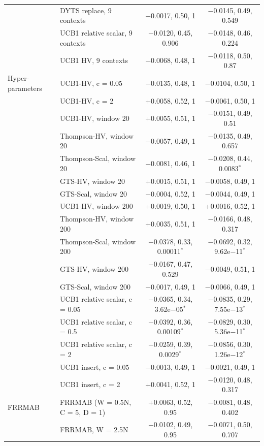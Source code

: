 \documentclass[final,3p,times,11pt,authoryear]{elsarticle}
\begin{document}
\begin{center}
\begin{tabularx}{\linewidth}{lXcc}
 & DYTS replace, 9 contexts & $-$0.0017, 0.50, 1 & $-$0.0145, 0.49, 0.549 \\
 & UCB1 relative scalar, 9 contexts & $-$0.0120, 0.45, 0.906 & $-$0.0148, 0.46, 0.224 \\
 & UCB1 HV, 9 contexts & $-$0.0068, 0.48, 1 & $-$0.0118, 0.50, 0.87 \\
Hyper-parameters & UCB1-HV, c = 0.05 & $-$0.0135, 0.48, 1 & $-$0.0104, 0.50, 1 \\
 & UCB1-HV, c = 2 & +0.0058, 0.52, 1 & $-$0.0061, 0.50, 1 \\
 & UCB1-HV, window 20 & +0.0055, 0.51, 1 & $-$0.0151, 0.49, 0.51 \\
 & Thompson-HV, window 20 & $-$0.0057, 0.49, 1 & $-$0.0135, 0.49, 0.657 \\
 & Thompson-Scal, window 20 & $-$0.0081, 0.46, 1 & $-$0.0208, 0.44, 0.0083$^{*}$ \\
 & GTS-HV, window 20 & +0.0015, 0.51, 1 & $-$0.0058, 0.49, 1 \\
 & GTS-Scal, window 20 & $-$0.0004, 0.52, 1 & $-$0.0044, 0.49, 1 \\
 & UCB1-HV, window 200 & +0.0019, 0.50, 1 & +0.0016, 0.52, 1 \\
 & Thompson-HV, window 200 & +0.0035, 0.51, 1 & $-$0.0166, 0.48, 0.317 \\
 & Thompson-Scal, window 200 & $-$0.0378, 0.33, 0.00011$^{*}$ & $-$0.0692, 0.32, 9.62e$-$11$^{*}$ \\
 & GTS-HV, window 200 & $-$0.0167, 0.47, 0.529 & $-$0.0049, 0.51, 1 \\
 & GTS-Scal, window 200 & $-$0.0017, 0.49, 1 & $-$0.0066, 0.49, 1 \\
 & UCB1 relative scalar, c = 0.05 & $-$0.0365, 0.34, 3.62e$-$05$^{*}$ & $-$0.0835, 0.29, 7.55e$-$13$^{*}$ \\
 & UCB1 relative scalar, c = 0.5 & $-$0.0392, 0.36, 0.00109$^{*}$ & $-$0.0829, 0.30, 5.36e$-$11$^{*}$ \\
 & UCB1 relative scalar, c = 2 & $-$0.0259, 0.39, 0.0029$^{*}$ & $-$0.0856, 0.30, 1.26e$-$12$^{*}$ \\
 & UCB1 insert, c = 0.05 & $-$0.0013, 0.49, 1 & $-$0.0021, 0.49, 1 \\
 & UCB1 insert, c = 2 & +0.0041, 0.52, 1 & $-$0.0120, 0.48, 0.317 \\
FRRMAB & FRRMAB (W = 0.5N, C = 5, D = 1) & +0.0063, 0.52, 0.95 & $-$0.0081, 0.48, 0.402 \\
 & FRRMAB, W = 2.5N & $-$0.0102, 0.49, 0.95 & $-$0.0071, 0.50, 0.707 \\

\end{tabularx}
\end{center}
\end{document}

